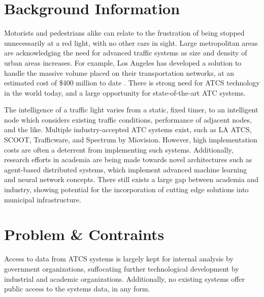\documentclass[a4paper,10pt]{article}
\begin{document}
\begin{multicols}{2}
\section{Background Information}
Motorists and pedestrians alike can relate to the frustration of being stopped unnecessarily at a red light, with no other cars in sight.
Large metropolitan areas are acknowledging the need for advanced traffic systems as size and density of urban areas increases.
For example, Los Angeles has developed a solution to handle the massive volume placed on their transportation networks, at an estimated cost of \$400 million to date \cite{la-atcs-article}.
There is strong need for ATCS technology in the world today, and a large opportunity for state-of-the-art ATC systems.

The intelligence of a traffic light varies from a static, fixed timer, to an intelligent node which considers existing traffic conditions, performance of adjacent nodes, and the like.
Multiple industry-accepted ATC systems exist, such as LA ATCS, SCOOT, Trafficware, and Spectrum by Miovision.
However, high implementation costs are often a deterrent from implementing such systems.
Additionally, research efforts in academia are being made towards novel architectures such as agent-based distributed systems, which implement advanced machine learning and neural network concepts\cite{1688100, 5073360, uot-article}.
There still exists a large gap between academia and industry, showing potential for the incorporation of cutting edge solutions into municipal infrastructure.


\section{Problem \& Contraints}

Access to data from ATCS systems is largely kept for internal analysis by government organizations, suffocating further technological development by industrial and academic organizations.
Additionally, no existing systems offer public access to the systems data, in any form.


\end{multicols}
\end{document}
